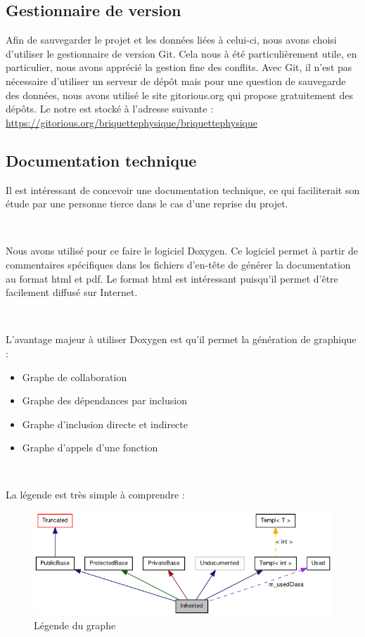 \documentclass[frenchb,twoside]{EPURapport}
\begin{document}
			
		\subsection{Gestionnaire de version}
		Afin de sauvegarder le projet et les données liées à celui-ci, nous avons
        choisi d'utiliser le gestionnaire de version Git. Cela nous à été
        particulièrement utile, en particulier, nous avons apprécié la gestion
        fine des conflits.
		Avec Git, il n'est pas nécessaire d'utiliser un serveur de dépôt mais
		pour une question de sauvegarde des données, nous avons utilisé le site
		gitorious.org qui propose gratuitement des dépôts.
		Le notre est stocké à l'adresse suivante : \url{https://gitorious.org/briquettephysique/briquettephysique}
		
		\subsection{Documentation technique}
		
		Il est intéressant de concevoir une documentation technique, ce qui faciliterait
		son étude par une personne tierce dans le cas d'une reprise du projet.
		
		\
		
		Nous avons utilisé pour ce faire le logiciel Doxygen.
		Ce logiciel permet à partir de commentaires spécifiques dans les fichiers d'en-tête
		de générer la documentation au format html et pdf.
		Le format html est intéressant puisqu'il permet d'être facilement diffusé sur Internet.
		
		\
		
		L'avantage majeur à utiliser Doxygen est qu'il permet la génération de graphique :
		\begin{itemize}
			\item Graphe de collaboration
			\item Graphe des dépendances par inclusion
			\item Graphe d'inclusion directe et indirecte
			\item Graphe d'appels d'une fonction
		\end{itemize}
		
        \
		
		La légende est très simple à comprendre :
		\begin{figure}[h]
			\centering
			\includegraphics[width=12cm]{images/graph_legend.png}
			\caption{\label{fig:graph_legend}Légende du graphe}
		\end{figure}
		
\end{document}
